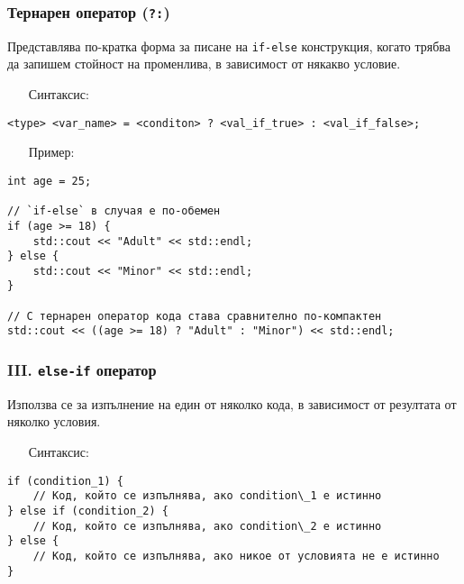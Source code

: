 \documentclass[oneside]{book}
\newcommand*{\code}[1]{\texttt{#1}}
\begin{document}
\subsubsection{Тернарен оператор (\code{?:})}
Представлява по-кратка форма за писане на \code{if-else} конструкция, когато трябва да запишем стойност на променлива, в зависимост от някакво условие.

\begin{itemize}\item[Синтаксис:]\end{itemize}\vspace{-6pt}
\begin{mdframed}\begin{lstlisting}
<type> <var_name> = <conditon> ? <val_if_true> : <val_if_false>;
\end{lstlisting}\end{mdframed}
\pagebreak
\begin{itemize}\item[Пример:]\end{itemize}
\begin{mdframed}\begin{lstlisting}
int age = 25;

// `if-else` в случая е по-обемен
if (age >= 18) {
    std::cout << "Adult" << std::endl;
} else {
    std::cout << "Minor" << std::endl;
}

// С тернарен оператор кода става сравнително по-компактен
std::cout << ((age >= 18) ? "Adult" : "Minor") << std::endl;
\end{lstlisting}\end{mdframed}

\subsubsection{III. \code{else-if} оператор}
Използва се за изпълнение на един от няколко кода, в зависимост от резултата от няколко условия.

\begin{itemize}\item[Синтаксис:]\end{itemize}
\begin{mdframed}\begin{lstlisting}
if (condition_1) {
    // Код, който се изпълнява, ако condition\_1 е истинно
} else if (condition_2) {
    // Код, който се изпълнява, ако condition\_2 е истинно
} else {
    // Код, който се изпълнява, ако никое от условията не е истинно
}
\end{lstlisting}\end{mdframed}
\end{document}
